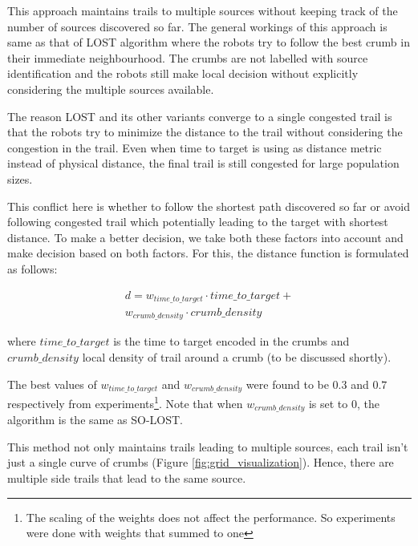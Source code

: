 \documentclass[letterpaper, 10 pt, conference]{ieeeconf}  %
\begin{document}
This approach maintains trails to multiple sources without keeping track of the number of sources discovered so far. The general workings of this approach is same as that of LOST algorithm where the robots try to follow the best crumb in their immediate neighbourhood. The crumbs are not labelled with source identification and the robots still make local decision without explicitly considering the multiple sources available. 

The reason LOST and its other variants converge to a single congested trail is that the robots try to minimize the distance to the trail without considering the congestion in the trail. Even when time to target is using as distance metric instead of physical distance, the final trail is still congested for large population sizes. 

This conflict here is whether to follow the shortest path discovered so far or avoid following congested trail which potentially leading to the target with shortest distance. To make a better decision, we take both these factors into account and make decision based on both factors. For this, the distance function is formulated as follows:

\begin{equation}
\begin{split}
   d = w_{time\_to\_target}  \cdot time\_to\_target + \\
          w_{crumb\_density} \cdot crumb\_density
\end{split}
\end{equation}

where $time\_to\_target$ is the time to target encoded in the crumbs and $crumb\_density$ local density of trail around a crumb (to be discussed shortly).

The best values of $w_{time\_to\_target}$ and $w_{crumb\_density}$ were found to be  $0.3$ and $0.7$ respectively from experiments\footnote{The scaling of the weights does not affect the performance. So experiments were done with weights that summed to one}. Note that when $w_{crumb\_density}$ is set to $0$, the algorithm is the same as SO-LOST.

This method not only maintains trails leading to multiple sources, each trail isn't just a single curve of crumbs (Figure \ref{fig:grid_visualization}). Hence, there are multiple side trails that lead to the same source.
\end{document}
